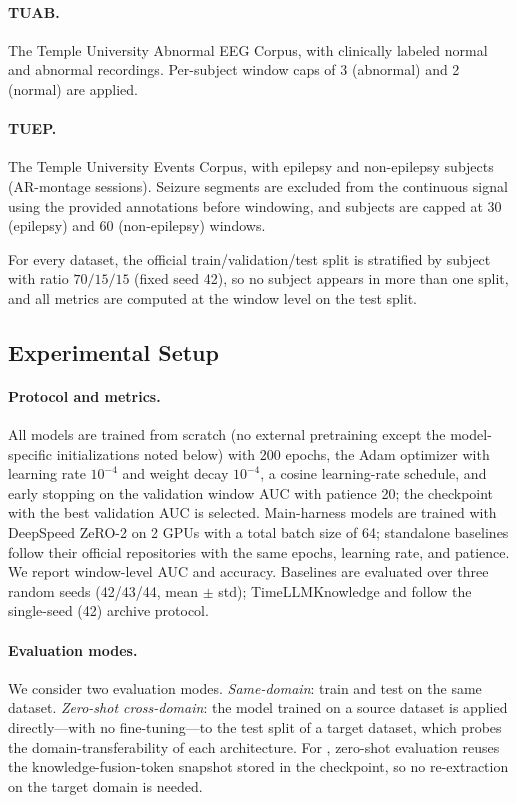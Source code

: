 \paragraph{TUAB.}  The Temple University Abnormal EEG
Corpus, with clinically labeled normal and abnormal recordings. Per-subject
window caps of 3 (abnormal) and 2 (normal) are applied.

\paragraph{TUEP.}  The Temple University Events Corpus,
with epilepsy and non-epilepsy subjects (AR-montage sessions). Seizure
segments are excluded from the continuous signal using the provided
annotations before windowing, and subjects are capped at 30 (epilepsy) and
60 (non-epilepsy) windows.

For every dataset, the official train/validation/test split is stratified by
subject with ratio $70/15/15$ (fixed seed 42), so no subject appears in more
than one split, and all metrics are computed at the window level on the test
split.

\subsection{Experimental Setup}
\label{sec:exp-setup}

\paragraph{Protocol and metrics.} All models are trained from scratch (no
external pretraining except the model-specific initializations noted below)
with 200 epochs, the Adam optimizer with learning rate $10^{-4}$ and weight
decay $10^{-4}$, a cosine learning-rate schedule, and early stopping on the
validation window AUC with patience 20; the checkpoint with the best
validation AUC is selected. Main-harness models are trained with DeepSpeed
ZeRO-2 on 2 GPUs with a total batch size of 64; standalone baselines follow
their official repositories with the same epochs, learning rate, and patience.
We report window-level AUC and accuracy. Baselines are evaluated over three
random seeds (42/43/44, mean $\pm$ std); TimeLLMKnowledge and \modelname
follow the single-seed (42) archive protocol.

\paragraph{Evaluation modes.} We consider two evaluation modes.
\emph{Same-domain}: train and test on the same dataset. \emph{Zero-shot
cross-domain}: the model trained on a source dataset is applied directly---with
no fine-tuning---to the test split of a target dataset, which probes the
domain-transferability of each architecture. For \modelname, zero-shot
evaluation reuses the knowledge-fusion-token snapshot stored in the
checkpoint, so no re-extraction on the target domain is needed.

